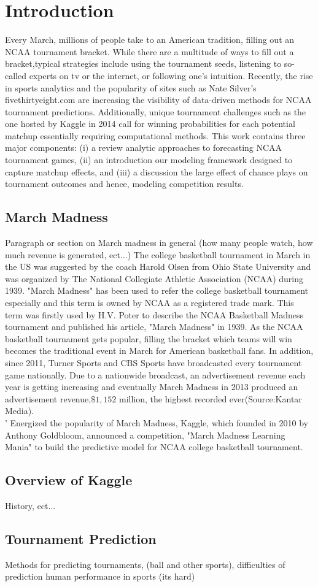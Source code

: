 \section{Introduction}
 Every March, millions of people take to an American tradition, filling out an NCAA tournament bracket.  While there are a multitude of ways to fill out a bracket,typical strategies include using the tournament seeds, listening to so-called experts on tv or the internet, or following one's intuition.  Recently, the rise in sports analytics and the popularity of sites such as Nate Silver's fivethirtyeight.com are increasing the visibility of data-driven methods for NCAA tournament predictions.  Additionally, unique tournament challenges such as the one hosted by Kaggle in 2014 call for winning probabilities for each potential matchup essentially requiring computational methods.  This work contains three major components: (i) a review analytic approaches to forecasting NCAA tournament games, (ii) an introduction our modeling framework designed to capture matchup effects, and (iii) a discussion the large effect of chance plays on tournament outcomes and hence, modeling competition results.
   
\subsection{March Madness}  Paragraph or section on March madness in general (how many people watch, how much revenue is generated, ect...)
\indent The college basketball tournament in March in the US was suggested by the coach Harold Olsen from Ohio State University and was organized by The National Collegiate Athletic Association (NCAA) during 1939. "March Madness" has been used to refer the college basketball tournament especially and this term is owned by NCAA as a registered trade mark. This term was firstly used by H.V. Poter to describe the NCAA Basketball Madness tournament and published his article, "March Madness" in 1939. As the NCAA basketball tournament gets popular, filling the bracket which teams will win becomes the traditional event in March for American basketball fans. In addition, since 2011, Turner Sports and CBS Sports have broadcasted every tournament game nationally. Due to a nationwide broadcast, an advertisement revenue each year is getting increasing and eventually March Madness in 2013 produced an advertisement revenue,$\$ 1,152$ million, the highest recorded ever(Source:Kantar Media).\\
'
Energized the popularity of March Madness, Kaggle, which founded in 2010 by Anthony Goldbloom, announced a competition, "March Madness Learning Mania" to build the predictive model for NCAA college basketball tournament.

\subsection{Overview of Kaggle} History, ect...


\subsection{Tournament Prediction}


Methods for predicting tournaments, (ball and other sports), difficulties of prediction human performance in sports (its hard)

